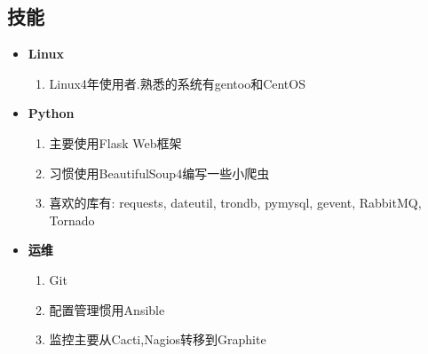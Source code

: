 \documentclass[11pt,letterpaper]{article}
\newcommand{\resitem}[1]{\item #1 \vspace{-2pt}}
\begin{document}
\begin{CJK}{UTF8}{gbsn}
\section{技能}
	\begin{itemize}
		\item
			\textbf{Linux}
			{ \footnotesize
			\begin{enumerate}
				\resitem{Linux4年使用者.熟悉的系统有gentoo和CentOS}
			\end{enumerate}
			}
		\item
			\textbf{Python}
			{ \footnotesize
			\begin{enumerate}
				\resitem{主要使用Flask Web框架}
				\resitem{习惯使用BeautifulSoup4编写一些小爬虫}
				\resitem{喜欢的库有: requests, dateutil, trondb, pymysql, gevent, RabbitMQ, Tornado}
			\end{enumerate}
			}
		\item
			\textbf{运维}
			{ \footnotesize
			\begin{enumerate}
				\resitem{Git}
				\resitem{配置管理惯用Ansible}
				\resitem{监控主要从Cacti,Nagios转移到Graphite}
			\end{enumerate}
			}
	\end{itemize}

\end{CJK} 
\end{document}
